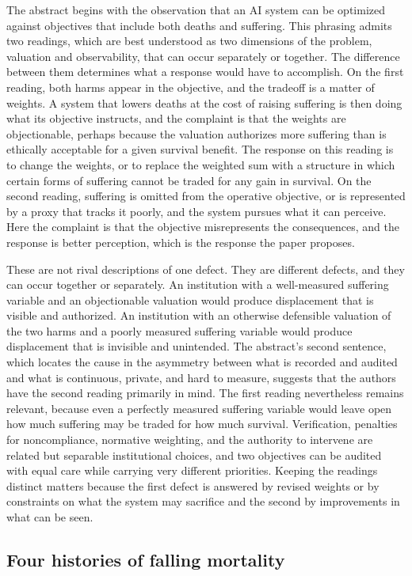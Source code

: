 \documentclass[11pt]{article}
\begin{document}
The abstract begins with the observation that an AI system can be optimized against objectives that include both deaths and suffering. This phrasing admits two readings, which are best understood as two dimensions of the problem, valuation and observability, that can occur separately or together. The difference between them determines what a response would have to accomplish. On the first reading, both harms appear in the objective, and the tradeoff is a matter of weights. A system that lowers deaths at the cost of raising suffering is then doing what its objective instructs, and the complaint is that the weights are objectionable, perhaps because the valuation authorizes more suffering than is ethically acceptable for a given survival benefit. The response on this reading is to change the weights, or to replace the weighted sum with a structure in which certain forms of suffering cannot be traded for any gain in survival. On the second reading, suffering is omitted from the operative objective, or is represented by a proxy that tracks it poorly, and the system pursues what it can perceive. Here the complaint is that the objective misrepresents the consequences, and the response is better perception, which is the response the paper proposes.

These are not rival descriptions of one defect. They are different defects, and they can occur together or separately. An institution with a well-measured suffering variable and an objectionable valuation would produce displacement that is visible and authorized. An institution with an otherwise defensible valuation of the two harms and a poorly measured suffering variable would produce displacement that is invisible and unintended. The abstract's second sentence, which locates the cause in the asymmetry between what is recorded and audited and what is continuous, private, and hard to measure, suggests that the authors have the second reading primarily in mind. The first reading nevertheless remains relevant, because even a perfectly measured suffering variable would leave open how much suffering may be traded for how much survival. Verification, penalties for noncompliance, normative weighting, and the authority to intervene are related but separable institutional choices, and two objectives can be audited with equal care while carrying very different priorities. Keeping the readings distinct matters because the first defect is answered by revised weights or by constraints on what the system may sacrifice and the second by improvements in what can be seen.
\subsection{Four histories of falling mortality}
\end{document}
